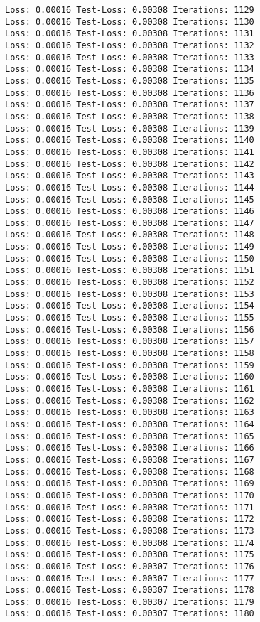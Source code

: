 \documentclass[11pt]{article}
\begin{document}
\begin{Verbatim}[commandchars=\\\{\}]
Loss: 0.00016 Test-Loss: 0.00308 Iterations: 1129
Loss: 0.00016 Test-Loss: 0.00308 Iterations: 1130
Loss: 0.00016 Test-Loss: 0.00308 Iterations: 1131
Loss: 0.00016 Test-Loss: 0.00308 Iterations: 1132
Loss: 0.00016 Test-Loss: 0.00308 Iterations: 1133
Loss: 0.00016 Test-Loss: 0.00308 Iterations: 1134
Loss: 0.00016 Test-Loss: 0.00308 Iterations: 1135
Loss: 0.00016 Test-Loss: 0.00308 Iterations: 1136
Loss: 0.00016 Test-Loss: 0.00308 Iterations: 1137
Loss: 0.00016 Test-Loss: 0.00308 Iterations: 1138
Loss: 0.00016 Test-Loss: 0.00308 Iterations: 1139
Loss: 0.00016 Test-Loss: 0.00308 Iterations: 1140
Loss: 0.00016 Test-Loss: 0.00308 Iterations: 1141
Loss: 0.00016 Test-Loss: 0.00308 Iterations: 1142
Loss: 0.00016 Test-Loss: 0.00308 Iterations: 1143
Loss: 0.00016 Test-Loss: 0.00308 Iterations: 1144
Loss: 0.00016 Test-Loss: 0.00308 Iterations: 1145
Loss: 0.00016 Test-Loss: 0.00308 Iterations: 1146
Loss: 0.00016 Test-Loss: 0.00308 Iterations: 1147
Loss: 0.00016 Test-Loss: 0.00308 Iterations: 1148
Loss: 0.00016 Test-Loss: 0.00308 Iterations: 1149
Loss: 0.00016 Test-Loss: 0.00308 Iterations: 1150
Loss: 0.00016 Test-Loss: 0.00308 Iterations: 1151
Loss: 0.00016 Test-Loss: 0.00308 Iterations: 1152
Loss: 0.00016 Test-Loss: 0.00308 Iterations: 1153
Loss: 0.00016 Test-Loss: 0.00308 Iterations: 1154
Loss: 0.00016 Test-Loss: 0.00308 Iterations: 1155
Loss: 0.00016 Test-Loss: 0.00308 Iterations: 1156
Loss: 0.00016 Test-Loss: 0.00308 Iterations: 1157
Loss: 0.00016 Test-Loss: 0.00308 Iterations: 1158
Loss: 0.00016 Test-Loss: 0.00308 Iterations: 1159
Loss: 0.00016 Test-Loss: 0.00308 Iterations: 1160
Loss: 0.00016 Test-Loss: 0.00308 Iterations: 1161
Loss: 0.00016 Test-Loss: 0.00308 Iterations: 1162
Loss: 0.00016 Test-Loss: 0.00308 Iterations: 1163
Loss: 0.00016 Test-Loss: 0.00308 Iterations: 1164
Loss: 0.00016 Test-Loss: 0.00308 Iterations: 1165
Loss: 0.00016 Test-Loss: 0.00308 Iterations: 1166
Loss: 0.00016 Test-Loss: 0.00308 Iterations: 1167
Loss: 0.00016 Test-Loss: 0.00308 Iterations: 1168
Loss: 0.00016 Test-Loss: 0.00308 Iterations: 1169
Loss: 0.00016 Test-Loss: 0.00308 Iterations: 1170
Loss: 0.00016 Test-Loss: 0.00308 Iterations: 1171
Loss: 0.00016 Test-Loss: 0.00308 Iterations: 1172
Loss: 0.00016 Test-Loss: 0.00308 Iterations: 1173
Loss: 0.00016 Test-Loss: 0.00308 Iterations: 1174
Loss: 0.00016 Test-Loss: 0.00308 Iterations: 1175
Loss: 0.00016 Test-Loss: 0.00307 Iterations: 1176
Loss: 0.00016 Test-Loss: 0.00307 Iterations: 1177
Loss: 0.00016 Test-Loss: 0.00307 Iterations: 1178
Loss: 0.00016 Test-Loss: 0.00307 Iterations: 1179
Loss: 0.00016 Test-Loss: 0.00307 Iterations: 1180

\end{Verbatim}
\end{document}
